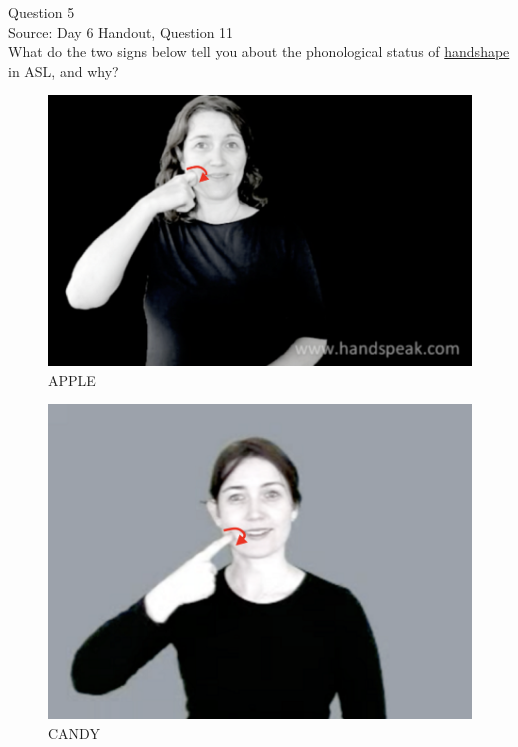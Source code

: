\documentclass[12pt]{article}
\begin{document}
\newpage

{\large Question 5}\\

Source: Day 6 Handout, Question 11\\

What do the two signs below tell you about the phonological status of \underline{handshape} in ASL, and why?\\

\begin{figure}[H]
\includegraphics{../images/asl_apple.png}
\caption{APPLE}
\end{figure}
\begin{figure}[H]
\includegraphics{../images/asl_candy.png}
\caption{CANDY}
\end{figure}

\newpage

\begin{center}
\textbf{{\color{red}{\HUGE END OF EXAM}}}\\

\end{center}
\newpage
\end{document}
